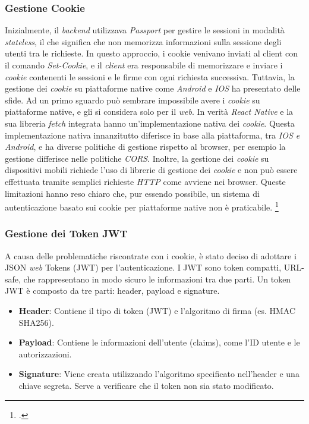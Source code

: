 \subsubsection{Gestione Cookie}
Inizialmente, il \textit{backend} utilizzava \textit{Passport} per gestire le sessioni in modalità \textit{stateless}, 
il che significa che non memorizza informazioni sulla sessione degli utenti tra le richieste.
In questo approccio, i cookie venivano inviati al client con il comando \textit{Set-Cookie}, e il \textit{client} era responsabile di memorizzare e inviare i \textit{cookie} contenenti le sessioni e le firme con ogni richiesta successiva.
Tuttavia, la gestione dei \textit{cookie} su piattaforme native come \textit{Android} e \textit{IOS} ha presentato delle sfide.
Ad un primo sguardo può sembrare impossibile avere i \textit{cookie} su piattaforme native, e gli si considera solo per il \textit{web}.
In verità \textit{React Native} e la sua libreria \textit{fetch} integrata hanno un'implementazione nativa dei \textit{cookie}.
Questa implementazione nativa innanzitutto diferisce in base alla piattaforma, tra \textit{IOS e Android}, e ha diverse politiche di gestione
rispetto al browser, per esempio la gestione differisce nelle politiche \textit{CORS}.
Inoltre, la gestione dei \textit{cookie} su dispositivi mobili richiede l'uso di librerie di gestione dei \textit{cookie} e non può essere effettuata tramite semplici richieste \textit{HTTP} come avviene nei browser. 
Queste limitazioni hanno reso chiaro che, pur essendo possibile, un sistema di autenticazione basato sui cookie per piattaforme native non è praticabile.
\footcite{site:reactnativecookieauth}

\subsubsection{Gestione dei Token JWT}
A causa delle problematiche riscontrate con i cookie, è stato deciso di adottare i JSON \textit{web} Tokens (JWT) per l'autenticazione. 
I JWT sono token compatti, URL-safe, che rappresentano in modo sicuro le informazioni tra due parti.
Un token JWT è composto da tre parti: header, payload e signature.

\begin{itemize}
    \item \textbf{Header}: Contiene il tipo di token (JWT) e l'algoritmo di firma (es. HMAC SHA256).
    \item \textbf{Payload}: Contiene le informazioni dell'utente (claims), come l'ID utente e le autorizzazioni.
    \item \textbf{Signature}: Viene creata utilizzando l'algoritmo specificato nell'header e una chiave segreta. Serve a verificare che il token non sia stato modificato.
\end{itemize}

